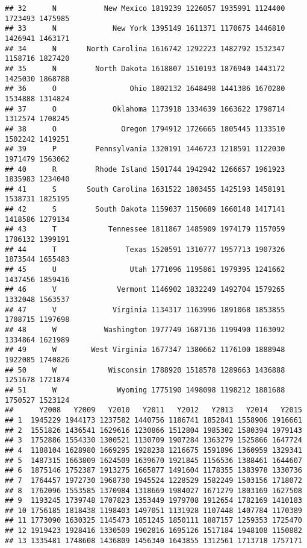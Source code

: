\documentclass[
]{article}
\begin{document}
\begin{verbatim}
## 32      N           New Mexico 1819239 1226057 1935991 1124400 1723493 1475985
## 33      N             New York 1395149 1611371 1170675 1446810 1426941 1463171
## 34      N       North Carolina 1616742 1292223 1482792 1532347 1158716 1827420
## 35      N         North Dakota 1618807 1510193 1876940 1443172 1425030 1868788
## 36      O                 Ohio 1802132 1648498 1441386 1670280 1534888 1314824
## 37      O             Oklahoma 1173918 1334639 1663622 1798714 1312574 1708245
## 38      O               Oregon 1794912 1726665 1805445 1133510 1502242 1419251
## 39      P         Pennsylvania 1320191 1446723 1218591 1122030 1971479 1563062
## 40      R         Rhode Island 1501744 1942942 1266657 1961923 1835983 1234040
## 41      S       South Carolina 1631522 1803455 1425193 1458191 1538731 1825195
## 42      S         South Dakota 1159037 1150689 1660148 1417141 1418586 1279134
## 43      T            Tennessee 1811867 1485909 1974179 1157059 1786132 1399191
## 44      T                Texas 1520591 1310777 1957713 1907326 1873544 1655483
## 45      U                 Utah 1771096 1195861 1979395 1241662 1437456 1859416
## 46      V              Vermont 1146902 1832249 1492704 1579265 1332048 1563537
## 47      V             Virginia 1134317 1163996 1891068 1853855 1708715 1197698
## 48      W           Washington 1977749 1687136 1199490 1163092 1334864 1621989
## 49      W        West Virginia 1677347 1380662 1176100 1888948 1922085 1740826
## 50      W            Wisconsin 1788920 1518578 1289663 1436888 1251678 1721874
## 51      W              Wyoming 1775190 1498098 1198212 1881688 1750527 1523124
##      Y2008   Y2009   Y2010   Y2011   Y2012   Y2013   Y2014   Y2015
## 1  1945229 1944173 1237582 1440756 1186741 1852841 1558906 1916661
## 2  1551826 1436541 1629616 1230866 1512804 1985302 1580394 1979143
## 3  1752886 1554330 1300521 1130709 1907284 1363279 1525866 1647724
## 4  1188104 1628980 1669295 1928238 1216675 1591896 1360959 1329341
## 5  1487315 1663809 1624509 1639670 1921845 1156536 1388461 1644607
## 6  1875146 1752387 1913275 1665877 1491604 1178355 1383978 1330736
## 7  1764457 1972730 1968730 1945524 1228529 1582249 1503156 1718072
## 8  1762096 1553585 1370984 1318669 1984027 1671279 1803169 1627508
## 9  1193245 1739748 1707823 1353449 1979708 1912654 1782169 1410183
## 10 1756185 1818438 1198403 1497051 1131928 1107448 1407784 1170389
## 11 1773090 1630325 1145473 1851245 1850111 1887157 1259353 1725470
## 12 1919423 1928416 1330509 1902816 1695126 1517184 1948108 1150882
## 13 1335481 1748608 1436809 1456340 1643855 1312561 1713718 1757171

\end{verbatim}
\end{document}
